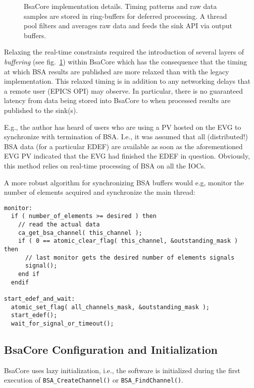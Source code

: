\documentclass[11pt]{article}
\newcommand{\bsac}{BsaCore}
\newcommand{\bsa} {BSA}
\newcommand{\EDEF}{EDEF}
\newcommand{\cod}[1]{{\tt#1}}
\newcounter{figs}
\newcommand{\fig}[3][0]{
\refstepcounter{figs}
\hfill\resizebox{#2}{!}{
        \rotatebox{#1}{\texttt{[image: \#3]}}}\hspace*{\fill}
}
\begin{document}
\begin{figure}
\fig{0.5\textwidth}{fig_impl.eps}
\label{fig:impl}
\caption{\bsac{} implementation details. Timing patterns and raw data samples
         are stored in ring-buffers for deferred processing. A thread pool
         filters and averages raw data and feeds the sink API via output
         buffers.}
\end{figure}

Relaxing the real-time constraints required the introduction of several
layers of {\em buffering} (see fig.~\ref{fig:impl}) within \bsac{} which
has the consequence that the timing at which \bsa{} results are published
are more relaxed than with the legacy implementation.
This relaxed timing is in addition to any
networking delays that a remote user (EPICS OPI) may observe. In particular,
there is no guaranteed latency from data being stored into \bsac{} to when
processed results are published to the sink(s).

E.g., the author has heard of users who are using a PV hosted on the EVG
to synchronize with termination of \bsa{}. I.e., it was assumed that
all (distributed!) \bsa{} data (for a particular \EDEF{}) are available
as soon as the aforementioned EVG PV indicated that the EVG had finished the
\EDEF{} in question. Obviously, this method relies on real-time 
processing of \bsa{} on all the IOCs.

A more robust algorithm for synchronizing \bsa{} buffers would
e.g, monitor the number of elements acquired and synchronize
the main thread:
\begin{lstlisting}
monitor:
  if ( number_of_elements >= desired ) then
    // read the actual data
    ca_get_bsa_channel( this_channel );
    if ( 0 == atomic_clear_flag( this_channel, &outstanding_mask ) then
      // last monitor gets the desired number of elements signals
      signal();
    end if
  endif

start_edef_and_wait:
  atomic_set_flag( all_channels_mask, &outstanding_mask );
  start_edef();
  wait_for_signal_or_timeout();
\end{lstlisting}

\subsection{\bsac{} Configuration and Initialization}
\bsac{} uses lazy initialization, i.e., the software is initialized
during the first execution of
\cod{BSA\_CreateChannel()} or \cod{BSA\_FindChannel()}.
\end{document}
